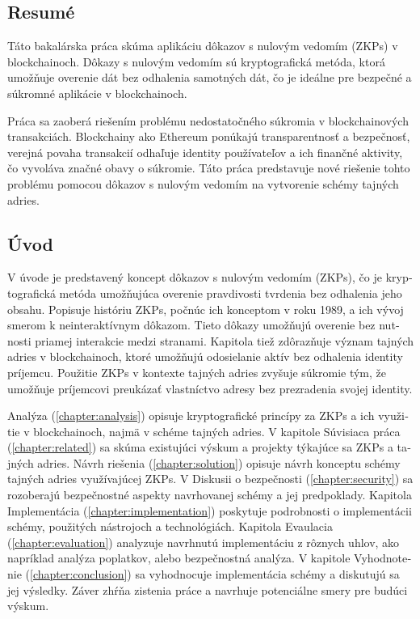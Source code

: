 \thispagestyle{empty}

\begin{otherlanguage}{slovak}
\chapter*{Resumé}

Táto bakalárska práca skúma aplikáciu dôkazov s nulovým vedomím (ZKPs) v
blockchainoch. Dôkazy s nulovým vedomím sú kryptografická metóda, ktorá
umožňuje overenie dát bez odhalenia samotných dát, čo je ideálne pre
bezpečné a súkromné aplikácie v blockchainoch.

Práca sa zaoberá riešením problému nedostatočného súkromia v
blockchainových transakciách. Blockchainy ako Ethereum ponúkajú
transparentnosť a bezpečnosť, verejná povaha transakcií odhaľuje identity
používateľov a ich finančné aktivity, čo vyvoláva značné obavy o súkromie.
Táto práca predstavuje nové riešenie tohto problému pomocou dôkazov s
nulovým vedomím na vytvorenie schémy tajných adries.

\section{Úvod}

V úvode  je predstavený koncept dôkazov s nulovým vedomím (ZKPs), čo je
kryptografická metóda umožňujúca overenie pravdivosti tvrdenia bez
odhalenia jeho obsahu. Popisuje históriu ZKPs, počnúc ich konceptom v roku
1989, a ich vývoj smerom k neinteraktívnym dôkazom. Tieto dôkazy umožňujú
overenie bez nutnosti priamej interakcie medzi stranami. Kapitola tiež
zdôrazňuje význam tajných adries v blockchainoch, ktoré umožňujú
odosielanie aktív bez odhalenia identity príjemcu. Použitie ZKPs v
kontexte tajných adries zvyšuje súkromie tým, že umožňuje príjemcovi
preukázať vlastníctvo adresy bez prezradenia svojej identity.

Analýza (\ref{chapter:analysis}) opisuje kryptografické princípy za ZKPs a
ich využitie v blockchainoch, najmä v schéme tajných adries. V kapitole
Súvisiaca práca (\ref{chapter:related}) sa skúma existujúci výskum a projekty
týkajúce sa ZKPs a tajných adries. Návrh riešenia (\ref{chapter:solution}) opisuje návrh
konceptu schémy tajných adries využívajúcej ZKPs. V Diskusii o
bezpečnosti (\ref{chapter:security}) sa rozoberajú bezpečnostné aspekty navrhovanej schémy a jej
predpoklady. Kapitola Implementácia (\ref{chapter:implementation}) poskytuje podrobnosti o implementácii
schémy, použitých nástrojoch a technológiách. Kapitola Evaulacia (\ref{chapter:evaluation}) analyzuje
navrhnutú implementáciu z rôznych uhlov, ako napríklad analýza poplatkov, alebo
bezpečnostná analýza.
V kapitole Vyhodnotenie (\ref{chapter:conclusion}) sa
vyhodnocuje implementácia schémy a diskutujú sa jej výsledky. Záver zhŕňa
zistenia práce a navrhuje potenciálne smery pre budúci výskum.

\end{otherlanguage}
